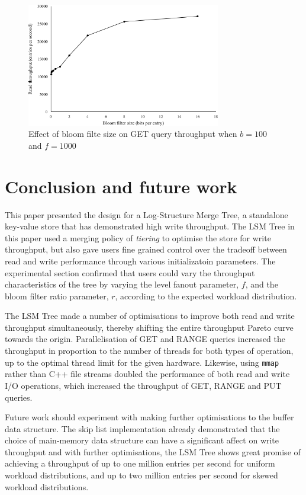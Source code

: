 \documentclass{acm}
\begin{document}
\begin{figure}
\centering
\includegraphics[width=3.33in]{bfratio}
\caption{Effect of bloom filte size on GET query throughput when $b=100$ and $f=1000$}
\end{figure}


\section{Conclusion and future work}

This paper presented the design for a Log-Structure Merge Tree, a standalone key-value store that has demonstrated high write throughput. The LSM Tree in this paper used a merging policy of \textit{tiering} to optimise the store for write throughput, but also gave users fine grained control over the tradeoff between read and write performance through various initializatoin parameters. The experimental section confirmed that users could vary the throughput characteristics of the tree by varying the level fanout parameter, $f$, and the bloom filter ratio parameter, $r$, according to the expected workload distribution.

The LSM Tree made a number of optimisations to improve both read and write throughput simultaneously, thereby shifting the entire throughput Pareto curve towards the origin. Parallelisation of GET and RANGE queries increased the throughput in proportion to the number of threads for both types of operation, up to the optimal thread limit for the given hardware. Likewise, using \texttt{mmap} rather than C++ file streams doubled the performance of both read and write I/O operations, which increased the throughput of GET, RANGE and PUT queries.

Future work should experiment with making further optimisations to the buffer data structure. The skip list implementation already demonstrated that the choice of main-memory data structure can have a significant affect on write throughput and with further optimisations, the LSM Tree shows great promise of achieving a throughput of up to one million entries per second for uniform workload distributions, and up to two million entries per second for skewed workload distributions.
\end{document}
